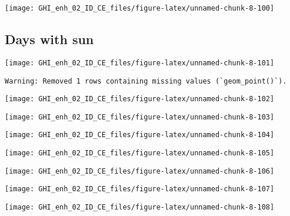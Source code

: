 \documentclass[
  10pt,
  a4paper,oneside]{article}
\begin{document}
\begin{center}\texttt{[image: GHI\_enh\_02\_ID\_CE\_files/figure-latex/unnamed-chunk-8-100]} \end{center}

\FloatBarrier

\hypertarget{days-with-sun}{%
\subsection{Days with sun}\label{days-with-sun}}

\begin{center}\texttt{[image: GHI\_enh\_02\_ID\_CE\_files/figure-latex/unnamed-chunk-8-101]} \end{center}

\begin{verbatim}
Warning: Removed 1 rows containing missing values (`geom_point()`).
\end{verbatim}

\begin{center}\texttt{[image: GHI\_enh\_02\_ID\_CE\_files/figure-latex/unnamed-chunk-8-102]} \end{center}

\begin{center}\texttt{[image: GHI\_enh\_02\_ID\_CE\_files/figure-latex/unnamed-chunk-8-103]} \end{center}

\begin{center}\texttt{[image: GHI\_enh\_02\_ID\_CE\_files/figure-latex/unnamed-chunk-8-104]} \end{center}

\begin{center}\texttt{[image: GHI\_enh\_02\_ID\_CE\_files/figure-latex/unnamed-chunk-8-105]} \end{center}

\begin{center}\texttt{[image: GHI\_enh\_02\_ID\_CE\_files/figure-latex/unnamed-chunk-8-106]} \end{center}

\begin{center}\texttt{[image: GHI\_enh\_02\_ID\_CE\_files/figure-latex/unnamed-chunk-8-107]} \end{center}

\begin{center}\texttt{[image: GHI\_enh\_02\_ID\_CE\_files/figure-latex/unnamed-chunk-8-108]} \end{center}
\end{document}
